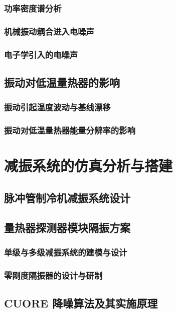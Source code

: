 \documentclass[type=master]{fduthesis}
\begin{document}
\subsection{功率密度谱分析}
\subsection{机械振动耦合进入电噪声}
\subsection{电子学引入的电噪声}





\section{振动对低温量热器的影响}
\subsection{振动引起温度波动与基线漂移}
\subsection{振动对低温量热器能量分辨率的影响}






\chapter{减振系统的仿真分析与搭建}

\section{脉冲管制冷机减振系统设计}

\section{量热器探测器模块隔振方案}
\subsection{单级与多级减振系统的建模与设计}
\subsection{零刚度隔振器的设计与研制}


\section{CUORE 降噪算法及其实施原理}
\end{document}
